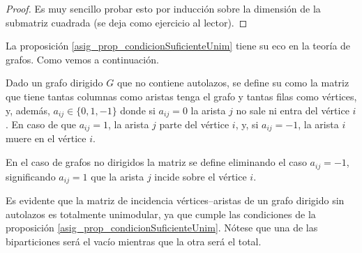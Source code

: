 \begin{proof}
	Es muy sencillo probar esto por inducción sobre la dimensión de la submatriz cuadrada (se deja como ejercicio al lector).
\end{proof}
La proposición \ref{asig_prop_condicionSuficienteUnim} tiene su eco en la teoría de grafos. Como vemos a continuación.
\begin{defi}
	Dado un grafo dirigido $G$ que no contiene autolazos, se define su  como la matriz que tiene tantas columnas como aristas tenga el grafo y tantas filas como vértices, y, además, $a_{ij}\in\{0,1,-1\}$ donde si $a_{ij}=0$ la arista $j$ no sale ni entra del vértice $i$. En caso de que $a_{ij}=1$, la arista $j$ parte del vértice $i$, y, si $a_{ij}=-1$, la arista $i$ muere en el vértice $i$.
	
	En el caso de grafos no dirigidos la matriz se define eliminando el caso $a_{ij}=-1$, significando $a_{ij}=1$ que la arista $j$ incide sobre el vértice $i$.
\end{defi}
\begin{obs}
	Es evidente que la matriz de incidencia vértices--aristas de un grafo dirigido sin autolazos es totalmente unimodular, ya que cumple las condiciones de la proposición \ref{asig_prop_condicionSuficienteUnim}. Nótese que una de las biparticiones será el vacío mientras que la otra será el total.
\end{obs}
